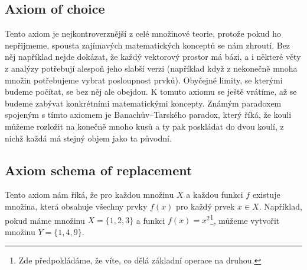 \subsection{Axiom of choice}
Tento axiom je nejkontroverznější z celé množinové teorie, protože pokud ho nepřijmeme, spousta zajímavých matematických konceptů se nám zhroutí. Bez něj například nejde dokázat, že každý vektorový prostor má bázi, a i některé věty z analýzy potřebují alespoň jeho slabší verzi (například když z nekonečně mnoha množin potřebujeme vybrat posloupnost prvků). Obyčejné limity, se kterými budeme počítat, se bez něj ale obejdou. K tomuto axiomu se ještě vrátíme, až se budeme zabývat konkrétními matematickými koncepty. Známým paradoxem spojeným s tímto axiomem je Banachův--Tarského paradox, který říká, že kouli můžeme rozložit na konečně mnoho kusů a ty pak poskládat do dvou koulí, z nichž každá má stejný objem jako ta původní. 
\subsection{Axiom schema of replacement}
Tento axiom nám říká, že pro každou množinu $X$ a každou funkci $f$ existuje množina, která obsahuje všechny prvky $f(x)$ pro každý prvek $x\in X$. Například, pokud máme množinu $X = \{1, 2, 3\}$ a funkci $f(x) = x^2$\footnote{Zde předpokládáme, že víte, co dělá základní operace na druhou.}, můžeme vytvořit množinu $Y = \{1, 4, 9\}$.

